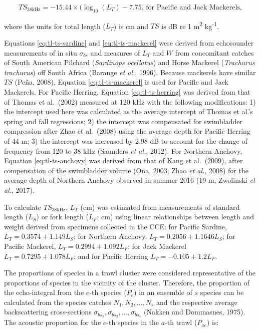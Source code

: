 \documentclass[]{article}
\begin{document}
\begin{equation}
  TS_{\mathrm{38kHz}} = -15.44 \times (\log_{10} (L_T) - 7.75 \text{, for Pacific and Jack Mackerels,}
  \label{eq:tl-ts-mackerel}
\end{equation}

where the units for total length (\(L_T\)) is cm and \(TS\) is dB re 1 m\textsuperscript{2} kg\textsuperscript{-1}.

Equations \eqref{eq:tl-ts-sardine} and \eqref{eq:tl-ts-mackerel} were derived from echosounder measurements of in situ \(\sigma_{bs}\) and measures of \(L_T\) and \(W\) from concomitant catches of South American Pilchard (\emph{Sardinops ocellatus}) and Horse Mackerel (\emph{Trachurus trachurus}) off South Africa (Barange \emph{et al.}, 1996). Because mackerels have similar \(TS\) (Peña, 2008), Equation \eqref{eq:tl-ts-mackerel} is used for Pacific and Jack Mackerels. For Pacific Herring, Equation \eqref{eq:tl-ts-herring} was derived from that of Thomas et al.~(2002) measured at 120 kHz with the following modifications: 1) the intercept used here was calculated as the average intercept of Thomas et al.'s spring and fall regressions; 2) the intercept was compensated for swimbladder compression after Zhao et al.~(2008) using the average depth for Pacific Herring of 44 m; 3) the intercept was increased by 2.98 dB to account for the change of frequency from 120 to 38 kHz (Saunders \emph{et al.}, 2012). For Northern Anchovy, Equation \eqref{eq:tl-ts-anchovy} was derived from that of Kang et al.~(2009), after compensation of the swimbladder volume (Ona, 2003; Zhao \emph{et al.}, 2008) for the average depth of Northern Anchovy observed in summer 2016 (19 m, Zwolinski \emph{et al.}, 2017).

To calculate \(TS_{38\mathrm{kHz}}\), \(L_T\) (cm) was estimated from measurements of standard length (\(L_S\)) or fork length (\(L_F\); cm) using linear relationships between length and weight derived from specimens collected in the CCE: for Pacific Sardine, \(L_T = 0.3574 + 1.149L_S\); for Northern Anchovy, \(L_T = 0.2056 + 1.1646 L_S\); for Pacific Mackerel, \(L_T = 0.2994 + 1.092 L_F\); for Jack Mackerel \(L_T = 0.7295 + 1.078 L_F\); and for Pacific Herring \(L_T = -0.105 + 1.2 L_F\).



The proportions of species in a trawl cluster were considered representative of the proportions of species in the vicinity of the cluster. Therefore, the proportion of the echo-integral from the \(e\)-th species (\(P_e\)) in an ensemble of \(s\) species can be calculated from the species catches \(N_1, N_2,..., N_s\) and the respective average backscattering cross-sections \(\sigma_{bs_1}, \sigma_{bs_2},...,\sigma_{bs_s}\) (Nakken and Dommasnes, 1975). The acoustic proportion for the \(e\)-th species in the \(a\)-th trawl (\(P_{ae}\)) is:
\end{document}
